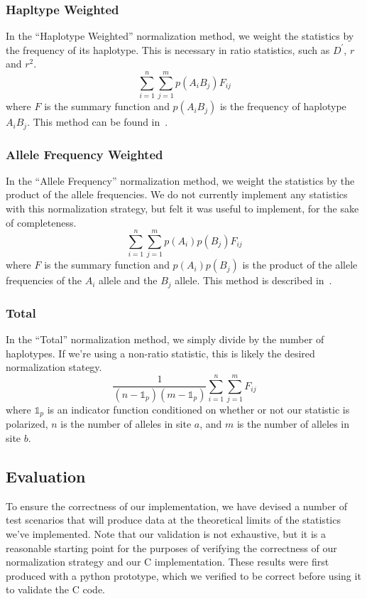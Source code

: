 \documentclass[12pt]{article}
\begin{document}
\subsubsection{Hapltype Weighted}
In the ``Haplotype Weighted'' normalization method, we weight the statistics by
the frequency of its haplotype. This is necessary in ratio statistics, such as
$D^{\prime}$, $r$ and $r^{2}$.
\[
  \sum_{i=1}^{n}\sum_{j=1}^{m}p(A_{i}B_{j})F_{ij}
\]
where $F$ is the summary function and $p(A_{i}B_{j})$ is the frequency of
haplotype $A_{i}B_{j}$. This method can be found
in~\cite{zhao2007evaluation}.

\subsubsection{Allele Frequency Weighted}
In the ``Allele Frequency'' normalization method, we weight the statistics by
the product of the allele frequencies. We do not currently implement any
statistics with this normalization strategy, but felt it was useful to
implement, for the sake of completeness.
\[
  \sum_{i=1}^{n}\sum_{j=1}^{m}p(A_{i})p(B_{j})F_{ij}
\]
where $F$ is the summary function and $p(A_{i})p(B_{j})$ is the product of the
allele frequencies of the $A_{i}$ allele and the $B_{j}$ allele. This method is
described in~\cite{hedrick1987gametic}.

\subsubsection{Total}
In the ``Total'' normalization method, we simply divide by the number of
haplotypes. If we're using a non-ratio statistic, this is likely the desired
normalization stategy.
\[
  \frac{1}{(n-\mathbb{1}_{p}) (m-\mathbb{1}_{p})}\sum_{i=1}^{n}\sum_{j=1}^{m}F_{ij}
\]
where $\mathbb{1}_{p}$ is an indicator function conditioned on whether or not
our statistic is polarized, $n$ is the number of alleles in site $a$, and $m$ is
the number of alleles in site $b$.

\subsection{Evaluation}
To ensure the correctness of our implementation, we have devised a number of
test scenarios that will produce data at the theoretical limits of the
statistics we've implemented. Note that our validation is not exhaustive, but it
is a reasonable starting point for the purposes of verifying the correctness of
our normalization strategy and our C implementation. These results were first
produced with a python prototype, which we verified to be correct before using
it to validate the C code.
\end{document}
